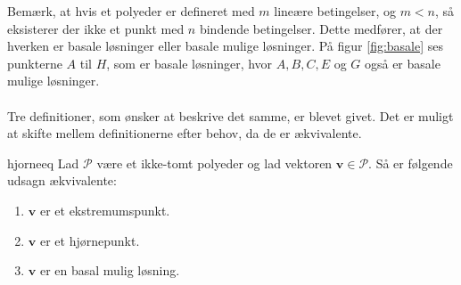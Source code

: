 %
Bemærk, at hvis et polyeder er defineret med $m$ lineære betingelser, og $m<n$, så eksisterer der ikke et punkt med $n$ bindende betingelser.
Dette medfører, at der hverken er basale løsninger eller basale mulige løsninger.
På figur \ref{fig:basale} ses punkterne $A$ til $H$, som er basale løsninger, hvor $A,B,C,E$ og $G$ også er basale mulige løsninger.
\\\\
%

%
Tre definitioner, som ønsker at beskrive det samme, er blevet givet.
Det er muligt at skifte mellem definitionerne efter behov, da de er ækvivalente.
%
\begin{thm}{}{hjorneeq}
Lad $\mathcal{P}$ være et ikke-tomt polyeder og lad vektoren $\textbf{v}\in \mathcal{P}$.
Så er følgende udsagn ækvivalente:
%
\begin{enumerate}[label=(\alph*)]
\item $\textbf{v}$ er et ekstremumspunkt.
\item $\textbf{v}$ er et hjørnepunkt.
\item $\textbf{v}$ er en basal mulig løsning.
\end{enumerate}
%
\end{thm}
%
